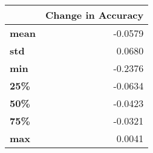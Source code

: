 \begin{tabular}{lr}
\toprule
{} &  Change in Accuracy \\
\midrule
\textbf{mean} &             -0.0579 \\
\textbf{std } &              0.0680 \\
\textbf{min } &             -0.2376 \\
\textbf{25\% } &             -0.0634 \\
\textbf{50\% } &             -0.0423 \\
\textbf{75\% } &             -0.0321 \\
\textbf{max } &              0.0041 \\
\bottomrule
\end{tabular}

